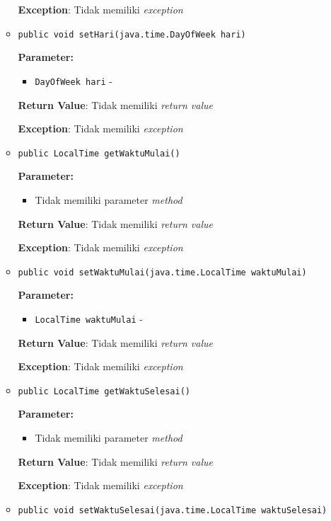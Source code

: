 \documentclass{article}
\begin{document}
\begin{enumerate}
\begin{itemize}
\textbf{Exception}: Tidak memiliki \textit{exception}

\item \texttt{public void setHari(java.time.DayOfWeek hari)}



\textbf{Parameter:}
\begin{itemize}
\item \texttt{DayOfWeek hari} - 
\end{itemize}
\textbf{Return Value}: Tidak memiliki \textit{return value}

\textbf{Exception}: Tidak memiliki \textit{exception}

\item \texttt{public LocalTime getWaktuMulai()}



\textbf{Parameter:}
\begin{itemize}
\item Tidak memiliki parameter \textit{method}
\end{itemize}
\textbf{Return Value}: Tidak memiliki \textit{return value}

\textbf{Exception}: Tidak memiliki \textit{exception}

\item \texttt{public void setWaktuMulai(java.time.LocalTime waktuMulai)}



\textbf{Parameter:}
\begin{itemize}
\item \texttt{LocalTime waktuMulai} - 
\end{itemize}
\textbf{Return Value}: Tidak memiliki \textit{return value}

\textbf{Exception}: Tidak memiliki \textit{exception}

\item \texttt{public LocalTime getWaktuSelesai()}



\textbf{Parameter:}
\begin{itemize}
\item Tidak memiliki parameter \textit{method}
\end{itemize}
\textbf{Return Value}: Tidak memiliki \textit{return value}

\textbf{Exception}: Tidak memiliki \textit{exception}

\item \texttt{public void setWaktuSelesai(java.time.LocalTime waktuSelesai)}




\end{itemize}
\end{enumerate}
\end{document}
